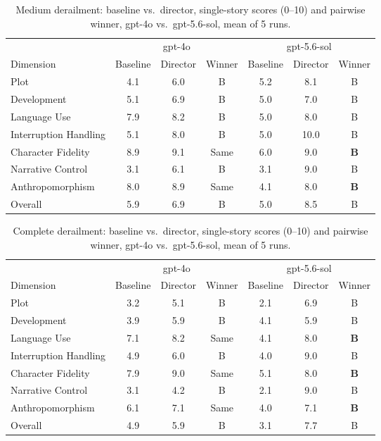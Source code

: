 \begin{table}[htbp]
\centering
\caption{Medium derailment: baseline vs.\ director, single-story scores (0--10) and pairwise winner, gpt-4o vs.\ gpt-5.6-sol, mean of 5 runs.}
\label{tab:judge-cmp-medium}
\small
\begin{tabular}{lcccccc}
\toprule
 & \multicolumn{3}{c}{gpt-4o} & \multicolumn{3}{c}{gpt-5.6-sol} \\
\cmidrule(lr){2-4} \cmidrule(lr){5-7}
Dimension & Baseline & Director & Winner & Baseline & Director & Winner \\
\midrule
Plot                    & 4.1 & 6.0 & B    & 5.2 & 8.1 & B \\
Development             & 5.1 & 6.9 & B    & 5.0 & 7.0 & B \\
Language Use            & 7.9 & 8.2 & B    & 5.0 & 8.0 & B \\
Interruption Handling   & 5.1 & 8.0 & B    & 5.0 & 10.0 & B \\
Character Fidelity      & 8.9 & 9.1 & Same & 6.0 & 9.0 & \textbf{B} \\
Narrative Control       & 3.1 & 6.1 & B    & 3.1 & 9.0 & B \\
Anthropomorphism        & 8.0 & 8.9 & Same & 4.1 & 8.0 & \textbf{B} \\
Overall                 & 5.9 & 6.9 & B    & 5.0 & 8.5 & B \\
\bottomrule
\end{tabular}
\end{table}

\begin{table}[htbp]
\centering
\caption{Complete derailment: baseline vs.\ director, single-story scores (0--10) and pairwise winner, gpt-4o vs.\ gpt-5.6-sol, mean of 5 runs.}
\label{tab:judge-cmp-complete}
\small
\begin{tabular}{lcccccc}
\toprule
 & \multicolumn{3}{c}{gpt-4o} & \multicolumn{3}{c}{gpt-5.6-sol} \\
\cmidrule(lr){2-4} \cmidrule(lr){5-7}
Dimension & Baseline & Director & Winner & Baseline & Director & Winner \\
\midrule
Plot                    & 3.2 & 5.1 & B    & 2.1 & 6.9 & B \\
Development             & 3.9 & 5.9 & B    & 4.1 & 5.9 & B \\
Language Use            & 7.1 & 8.2 & Same & 4.1 & 8.0 & \textbf{B} \\
Interruption Handling   & 4.9 & 6.0 & B    & 4.0 & 9.0 & B \\
Character Fidelity      & 7.9 & 9.0 & Same & 5.1 & 8.0 & \textbf{B} \\
Narrative Control       & 3.1 & 4.2 & B    & 2.1 & 9.0 & B \\
Anthropomorphism        & 6.1 & 7.1 & Same & 4.0 & 7.1 & \textbf{B} \\
Overall                 & 4.9 & 5.9 & B    & 3.1 & 7.7 & B \\
\bottomrule
\end{tabular}
\end{table}


